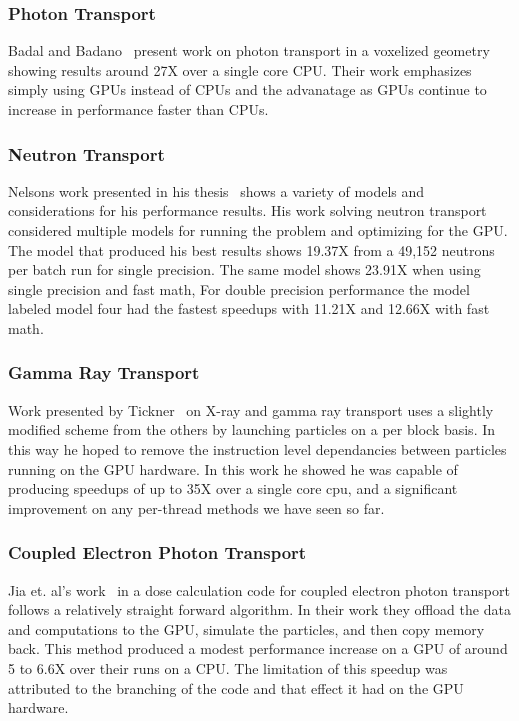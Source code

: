 \subsubsection*{\textbf{Photon Transport}}
%
Badal and Badano~\cite{badal2009accelerating} present work on photon transport in a voxelized geometry showing results around 27X over a single core CPU.
%
Their work emphasizes simply using GPUs instead of CPUs and the advanatage as GPUs continue to increase in performance faster than CPUs.
%

\subsubsection*{\textbf{Neutron Transport}}
%
Nelsons work presented in his thesis~\cite{nelson2009monte} shows a variety of models and considerations for his performance results.
%
His work solving neutron transport considered multiple models for running the problem and optimizing for the GPU.
%
The model that produced his best results shows 19.37X from a 49,152 neutrons per batch run for single precision.
%
The same model shows 23.91X when using single precision and fast math,
%
For double precision performance the model labeled model four had the fastest speedups with 11.21X and 12.66X with fast math.
%

\subsubsection*{\textbf{Gamma Ray Transport}}
%
Work presented by Tickner~\cite{tickner2010monte} on X-ray and gamma ray transport uses a slightly modified scheme from the others by launching particles on a per block basis.
%
In this way he hoped to remove the instruction level dependancies between particles running on the GPU hardware.
%
In this work he showed he was capable of producing speedups of up to 35X over a single core cpu, and a significant improvement on any per-thread methods we have seen so far.
%

\subsubsection*{\textbf{Coupled Electron Photon Transport}}
%
Jia et. al's  work~\cite{jia2010development} in a dose calculation code for coupled electron photon transport follows a relatively straight forward algorithm.
%
In their work they offload the data and computations to the GPU, simulate the particles, and then copy memory back.
This method produced a modest performance increase on a GPU of around 5 to 6.6X over their runs on a CPU.
%
The limitation of this speedup was attributed to the branching of the code and that effect it had on the GPU hardware.

